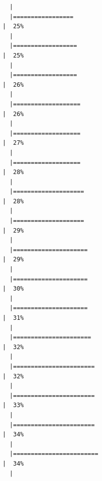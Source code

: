 \documentclass[
  letterpaper,
  DIV=11,
  numbers=noendperiod]{scrreprt}
\begin{document}
\begin{verbatim}
  |                                                                            
  |=================                                                     |  25%
  |                                                                            
  |==================                                                    |  25%
  |                                                                            
  |==================                                                    |  26%
  |                                                                            
  |===================                                                   |  26%
  |                                                                            
  |===================                                                   |  27%
  |                                                                            
  |===================                                                   |  28%
  |                                                                            
  |====================                                                  |  28%
  |                                                                            
  |====================                                                  |  29%
  |                                                                            
  |=====================                                                 |  29%
  |                                                                            
  |=====================                                                 |  30%
  |                                                                            
  |=====================                                                 |  31%
  |                                                                            
  |======================                                                |  32%
  |                                                                            
  |=======================                                               |  32%
  |                                                                            
  |=======================                                               |  33%
  |                                                                            
  |=======================                                               |  34%
  |                                                                            
  |========================                                              |  34%
  |                                                                            

\end{verbatim}
\end{document}
